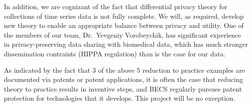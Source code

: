 In addition, we are cognizant of the fact that differential privacy
theory for collections of time series data is not fully complete.
We will, as required, develop new theory to enable an appropriate
balance between privacy and utility.  One of the members of our
team, Dr.~Yevgeniy Vorobeychik, has significant experience in
privacy-preserving data sharing with biomedical data, which has much
stronger dissemination contraints (HIPPA regulation)
than is the case for our data.

As indicated by the fact that 3 of the above 5 reduction to practice
examples are documented
via patents or patent applications, it is often the case that reducing
theory to practice results in inventive steps, and BECS regularly pursues
patent protection for technologies that it develops.  This project will
be no exception.
